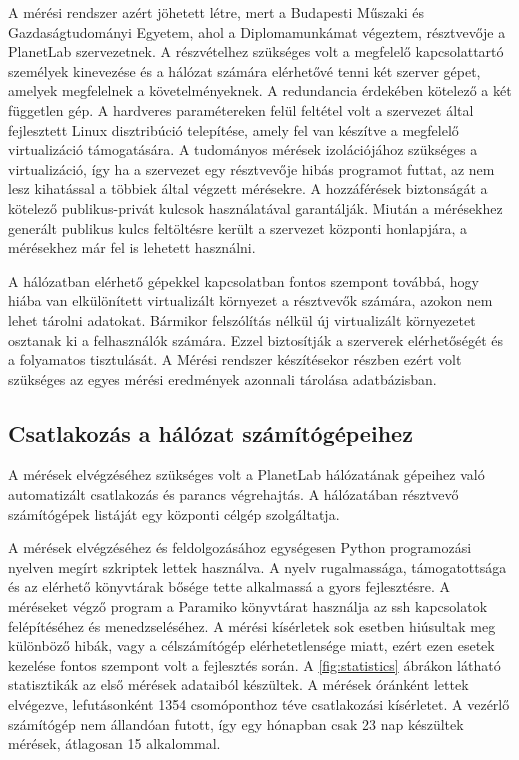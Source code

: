 A mérési rendszer azért jöhetett létre, mert a Budapesti Műszaki és Gazdaságtudományi Egyetem, ahol a Diplomamunkámat végeztem, résztvevője a PlanetLab szervezetnek. A részvételhez szükséges volt a megfelelő kapcsolattartó személyek kinevezése és a hálózat számára elérhetővé tenni két szerver gépet, amelyek megfelelnek a követelményeknek. A redundancia érdekében kötelező a két független gép. A hardveres paramétereken felül feltétel volt a szervezet által fejlesztett Linux disztribúció telepítése, amely fel van készítve a megfelelő virtualizáció támogatására. A tudományos mérések izolációjához szükséges a virtualizáció, így ha a szervezet egy résztvevője hibás programot futtat, az nem lesz kihatással a többiek által végzett mérésekre. A hozzáférések biztonságát a kötelező publikus-privát kulcsok használatával garantálják. Miután a mérésekhez generált publikus kulcs feltöltésre került a szervezet központi honlapjára, a mérésekhez már fel is lehetett használni.

A hálózatban elérhető gépekkel kapcsolatban fontos szempont továbbá, hogy hiába van elkülönített virtualizált környezet a résztvevők számára, azokon nem lehet tárolni adatokat. Bármikor felszólítás nélkül új virtualizált környezetet osztanak ki a felhasználók számára. Ezzel biztosítják a szerverek elérhetőségét és a folyamatos tisztulását. A Mérési rendszer készítésekor részben ezért volt szükséges az egyes mérési eredmények azonnali tárolása adatbázisban.

\subsection{Csatlakozás a hálózat számítógépeihez}

A mérések elvégzéséhez szükséges volt a PlanetLab hálózatának gépeihez való automatizált csatlakozás és parancs végrehajtás. A hálózatában résztvevő számítógépek listáját egy központi célgép szolgáltatja.

A mérések elvégzéséhez és feldolgozásához egységesen Python programozási nyelven megírt szkriptek lettek használva. A nyelv rugalmassága, támogatottsága és az elérhető könyvtárak bősége tette alkalmassá a gyors fejlesztésre. 
A méréseket végző program a Paramiko\cite{paramiko} könyvtárat használja az ssh kapcsolatok felépítéséhez és menedzseléséhez. A mérési kísérletek sok esetben hiúsultak meg különböző hibák, vagy a célszámítógép elérhetetlensége miatt, ezért ezen esetek kezelése fontos szempont volt a fejlesztés során. A \ref{fig:statistics} ábrákon látható statisztikák az első mérések adataiból készültek. A mérések óránként lettek elvégezve, lefutásonként 1354 csomóponthoz téve csatlakozási kísérletet. A vezérlő számítógép nem állandóan futott, így egy hónapban csak 23 nap készültek mérések, átlagosan 15 alkalommal.


